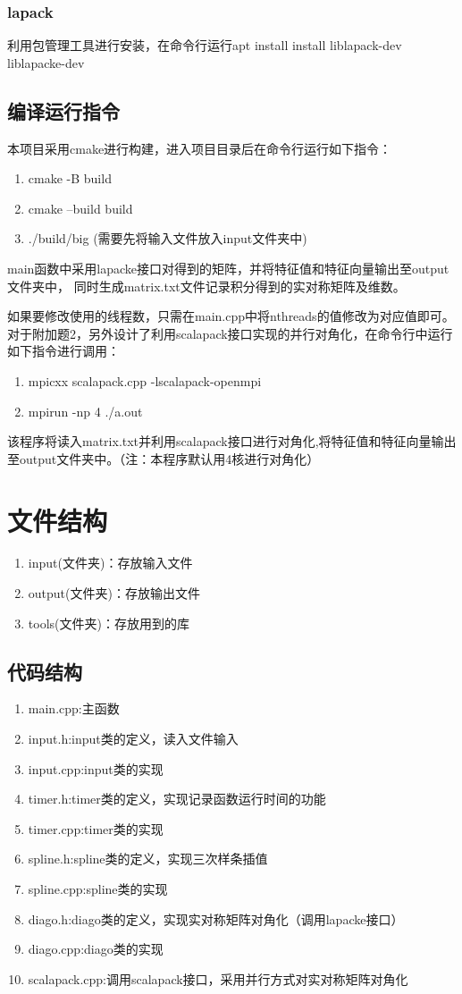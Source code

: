 \documentclass[UTF-8]{ctexart}
\begin{document}
\subsubsection{lapack}
利用包管理工具进行安装，在命令行运行apt install install liblapack-dev liblapacke-dev
\subsection{编译运行指令}
本项目采用cmake进行构建，进入项目目录后在命令行运行如下指令：
\begin{enumerate}
    \item cmake -B build
    \item cmake --build build
    \item ./build/big (需要先将输入文件放入input文件夹中)
\end{enumerate}
main函数中采用lapacke接口对得到的矩阵，并将特征值和特征向量输出至output文件夹中，
同时生成matrix.txt文件记录积分得到的实对称矩阵及维数。\par
如果要修改使用的线程数，只需在main.cpp中将nthreads的值修改为对应值即可。
对于附加题2，另外设计了利用scalapack接口实现的并行对角化，在命令行中运行如下指令进行调用：
\begin{enumerate}
    \item mpicxx scalapack.cpp -lscalapack-openmpi
    \item mpirun -np 4 ./a.out
\end{enumerate}
该程序将读入matrix.txt并利用scalapack接口进行对角化,将特征值和特征向量输出至output文件夹中。（注：本程序默认用4核进行对角化）
\section{文件结构}
\begin{enumerate}
    \item input(文件夹)：存放输入文件
    \item output(文件夹)：存放输出文件
    \item tools(文件夹)：存放用到的库
\end{enumerate}
\subsection{代码结构}
\begin{enumerate}
    \item main.cpp:主函数
    \item input.h:input类的定义，读入文件输入
    \item input.cpp:input类的实现
    \item timer.h:timer类的定义，实现记录函数运行时间的功能
    \item timer.cpp:timer类的实现
    \item spline.h:spline类的定义，实现三次样条插值
    \item spline.cpp:spline类的实现
    \item diago.h:diago类的定义，实现实对称矩阵对角化（调用lapacke接口）
    \item diago.cpp:diago类的实现
    \item scalapack.cpp:调用scalapack接口，采用并行方式对实对称矩阵对角化
\end{enumerate}
\end{document}

